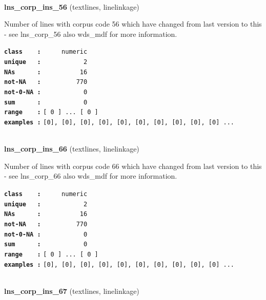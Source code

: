 \documentclass[]{article}
\begin{document}
~

\textbf{lns\_corp\_ins\_56} (textlines, linelinkage)

Number of lines with corpus code 56 which have changed from last version
to this - see lns\_corp\_56 also wds\_mdf for more information.

\textbf{\texttt{class\ \ \ \ :}} \texttt{~~~~~numeric}\\
\textbf{\texttt{unique\ \ \ :}} \texttt{~~~~~~~~~~~2}\\
\textbf{\texttt{NAs\ \ \ \ \ \ :}} \texttt{~~~~~~~~~~16}\\
\textbf{\texttt{not-NA\ \ \ :}} \texttt{~~~~~~~~~770}\\
\textbf{\texttt{not-0-NA\ :}} \texttt{~~~~~~~~~~~0}\\
\textbf{\texttt{sum\ \ \ \ \ \ :}} \texttt{~~~~~~~~~~~0}\\
\textbf{\texttt{range\ \ \ \ :}}
\texttt{{[}\ 0\ {]}\ ...\ {[}\ 0\ {]}}\\
\textbf{\texttt{examples\ :}}
\texttt{{[}0{]},\ {[}0{]},\ {[}0{]},\ {[}0{]},\ {[}0{]},\ {[}0{]},\ {[}0{]},\ {[}0{]},\ {[}0{]},\ {[}0{]}\ ...}\\

~

\textbf{lns\_corp\_ins\_66} (textlines, linelinkage)

Number of lines with corpus code 66 which have changed from last version
to this - see lns\_corp\_66 also wds\_mdf for more information.

\textbf{\texttt{class\ \ \ \ :}} \texttt{~~~~~numeric}\\
\textbf{\texttt{unique\ \ \ :}} \texttt{~~~~~~~~~~~2}\\
\textbf{\texttt{NAs\ \ \ \ \ \ :}} \texttt{~~~~~~~~~~16}\\
\textbf{\texttt{not-NA\ \ \ :}} \texttt{~~~~~~~~~770}\\
\textbf{\texttt{not-0-NA\ :}} \texttt{~~~~~~~~~~~0}\\
\textbf{\texttt{sum\ \ \ \ \ \ :}} \texttt{~~~~~~~~~~~0}\\
\textbf{\texttt{range\ \ \ \ :}}
\texttt{{[}\ 0\ {]}\ ...\ {[}\ 0\ {]}}\\
\textbf{\texttt{examples\ :}}
\texttt{{[}0{]},\ {[}0{]},\ {[}0{]},\ {[}0{]},\ {[}0{]},\ {[}0{]},\ {[}0{]},\ {[}0{]},\ {[}0{]},\ {[}0{]}\ ...}\\

~

\textbf{lns\_corp\_ins\_67} (textlines, linelinkage)
\end{document}
